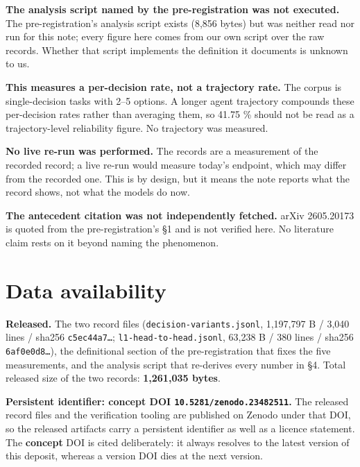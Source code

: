 \documentclass[11pt,a4paper]{article}
\begin{document}
\textbf{The analysis script named by the pre-registration was not executed.} The pre-registration's analysis script exists (8,856 bytes) but was neither read nor run for this note; every figure here comes from our own script over the raw records. Whether that script implements the definition it documents is unknown to us.

\textbf{This measures a per-decision rate, not a trajectory rate.} The corpus is single-decision tasks with 2--5 options. A longer agent trajectory compounds these per-decision rates rather than averaging them, so 41.75 \% should not be read as a trajectory-level reliability figure. No trajectory was measured.

\textbf{No live re-run was performed.} The records are a measurement of the recorded record; a live re-run would measure today's endpoint, which may differ from the recorded one. This is by design, but it means the note reports what the record shows, not what the models do now.

\textbf{The antecedent citation was not independently fetched.} arXiv 2605.20173 is quoted from the pre-registration's \S1 and is not verified here. No literature claim rests on it beyond naming the phenomenon.

\section{Data availability}

\textbf{Released.} The two record files (\texttt{decision-variants.jsonl}, 1,197,797 B / 3,040 lines / sha256 \texttt{c5ec44a7\ldots{}}; \texttt{l1-head-to-head.jsonl}, 63,238 B / 380 lines / sha256 \texttt{6af0e0d8\ldots{}}), the definitional section of the pre-registration that fixes the five measurements, and the analysis script that re-derives every number in \S4. Total released size of the two records: \textbf{1,261,035 bytes}.

\textbf{Persistent identifier: concept DOI \texttt{10.5281/zenodo.23482511}.} The released record files and the verification tooling are published on Zenodo under that DOI, so the released artifacts carry a persistent identifier as well as a licence statement. The \textbf{concept} DOI is cited deliberately: it always resolves to the latest version of this deposit, whereas a version DOI dies at the next version.
\end{document}
